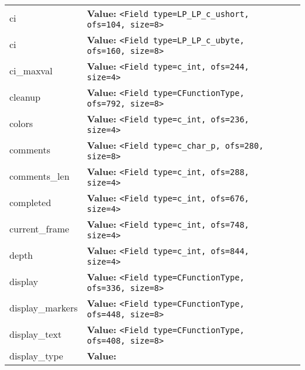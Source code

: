 \begin{longtable}{|p{\varnamewidth}|p{\vardescrwidth}|l}
\cline{1-2}
\raggedright c\-i\- & \raggedright \textbf{Value:} 
{\tt {\textless}Field type=LP\_LP\_c\_ushort, ofs=104, size=8{\textgreater}}&\\
\cline{1-2}
\raggedright c\-i\-8\- & \raggedright \textbf{Value:} 
{\tt {\textless}Field type=LP\_LP\_c\_ubyte, ofs=160, size=8{\textgreater}}&\\
\cline{1-2}
\raggedright c\-i\-\_\-m\-a\-x\-v\-a\-l\- & \raggedright \textbf{Value:} 
{\tt {\textless}Field type=c\_int, ofs=244, size=4{\textgreater}}&\\
\cline{1-2}
\raggedright c\-l\-e\-a\-n\-u\-p\- & \raggedright \textbf{Value:} 
{\tt {\textless}Field type=CFunctionType, ofs=792, size=8{\textgreater}}&\\
\cline{1-2}
\raggedright c\-o\-l\-o\-r\-s\- & \raggedright \textbf{Value:} 
{\tt {\textless}Field type=c\_int, ofs=236, size=4{\textgreater}}&\\
\cline{1-2}
\raggedright c\-o\-m\-m\-e\-n\-t\-s\- & \raggedright \textbf{Value:} 
{\tt {\textless}Field type=c\_char\_p, ofs=280, size=8{\textgreater}}&\\
\cline{1-2}
\raggedright c\-o\-m\-m\-e\-n\-t\-s\-\_\-l\-e\-n\- & \raggedright \textbf{Value:} 
{\tt {\textless}Field type=c\_int, ofs=288, size=4{\textgreater}}&\\
\cline{1-2}
\raggedright c\-o\-m\-p\-l\-e\-t\-e\-d\- & \raggedright \textbf{Value:} 
{\tt {\textless}Field type=c\_int, ofs=676, size=4{\textgreater}}&\\
\cline{1-2}
\raggedright c\-u\-r\-r\-e\-n\-t\-\_\-f\-r\-a\-m\-e\- & \raggedright \textbf{Value:} 
{\tt {\textless}Field type=c\_int, ofs=748, size=4{\textgreater}}&\\
\cline{1-2}
\raggedright d\-e\-p\-t\-h\- & \raggedright \textbf{Value:} 
{\tt {\textless}Field type=c\_int, ofs=844, size=4{\textgreater}}&\\
\cline{1-2}
\raggedright d\-i\-s\-p\-l\-a\-y\- & \raggedright \textbf{Value:} 
{\tt {\textless}Field type=CFunctionType, ofs=336, size=8{\textgreater}}&\\
\cline{1-2}
\raggedright d\-i\-s\-p\-l\-a\-y\-\_\-m\-a\-r\-k\-e\-r\-s\- & \raggedright \textbf{Value:} 
{\tt {\textless}Field type=CFunctionType, ofs=448, size=8{\textgreater}}&\\
\cline{1-2}
\raggedright d\-i\-s\-p\-l\-a\-y\-\_\-t\-e\-x\-t\- & \raggedright \textbf{Value:} 
{\tt {\textless}Field type=CFunctionType, ofs=408, size=8{\textgreater}}&\\
\cline{1-2}
\raggedright d\-i\-s\-p\-l\-a\-y\-\_\-t\-y\-p\-e\- & \raggedright \textbf{Value:} 

\end{longtable}
